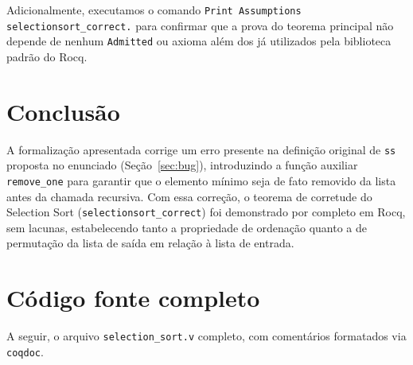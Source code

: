 \documentclass{article}
\begin{document}
Adicionalmente, executamos o comando \texttt{Print Assumptions
selectionsort\_correct.} para confirmar que a prova do teorema principal não
depende de nenhum \texttt{Admitted} ou axioma além dos já utilizados
pela biblioteca padrão do Rocq.

\section{Conclusão}

A formalização apresentada corrige um erro presente na definição original
de \texttt{ss} proposta no enunciado (Seção~\ref{sec:bug}), introduzindo a
função auxiliar \texttt{remove\_one} para garantir que o elemento mínimo
seja de fato removido da lista antes da chamada recursiva. Com essa
correção, o teorema de corretude do Selection Sort
(\texttt{selectionsort\_correct}) foi demonstrado por completo em Rocq,
sem lacunas, estabelecendo tanto a propriedade de ordenação quanto a de
permutação da lista de saída em relação à lista de entrada.

\section{Código fonte completo}

A seguir, o arquivo \texttt{selection\_sort.v} completo, com comentários
formatados via \texttt{coqdoc}.


\end{document}
